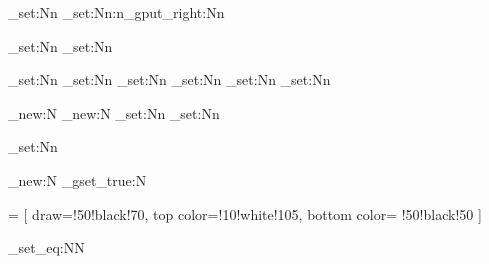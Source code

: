 
\usepackage{
  bookmark,
  cooltooltips,
  dtklogos,  %
  fontspec,
  geometry,
  hyperref,
  pdftexcmds,
  tikz,
  xcolor,
  xparse
}

\makeatletter
  \let\topdfescapestring\pdf@escapestring
\makeatother

\setmainfont{TeX Gyre Pagella}
\setsansfont{TeX Gyre Pagella}

\hypersetup{
  colorlinks=true,
  linkcolor=blue,
  urlcolor=blue,
  pdfborder=0 0 0   %
}

\date{\today}
\pagestyle{empty}

\ExplSyntaxNamesOn

\tl_set:Nn\settextviews{}
\cs_set:Nn\addtotextviews:n{\tl_gput_right:Nn}

\tl_set:Nn
\tl_set:Nn

\tl_set:Nn
\tl_set:Nn
\tl_set:Nn
\tl_set:Nn
\tl_set:Nn
\tl_set:Nn

\fp_new:N\layer
\fp_new:N\layerdist
\fp_set:Nn
\fp_set:Nn

\dim_set:Nn\fboxrule{-1mm}

\bool_new:N\short
\bool_gset_true:N\short

 = [
	draw=\nodecolor!50!black!70,
	top color=\nodecolor!10!white!105,
	bottom color= \nodecolor!50!black!50
]

\cs_set_eq:NN\tonodestyle\normalimportant

